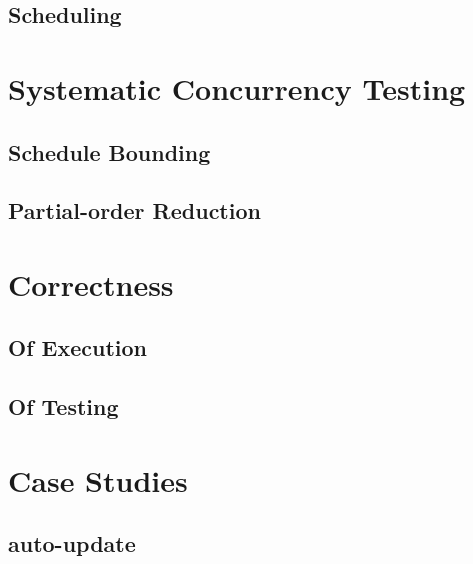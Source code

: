 \documentclass[openright, dottedtoc, headinclude, footinclude=true, a4paper, numbers=noenddot, fontsize=10pt]{scrreprt}
\begin{document}
  \section{Scheduling}
  \label{sec:execution-scheduling}
  

\null\clearpage
\chapter{Systematic Concurrency Testing}
\label{chap:sct}


  \section{Schedule Bounding}
  \label{sec:sct-bounding}
  

  \section{Partial-order Reduction}
  \label{sec:sct-por}
  

\null\clearpage
\chapter{Correctness}
\label{chap:correctness}


  \section{Of Execution}
  \label{sec:correctness-execution}
  

  \section{Of Testing}
  \label{sec:correctness-testing}
  

\null\clearpage
\chapter{Case Studies}
\label{chap:casestudies}


  \section{auto-update}
  \label{sec:casestudies-autoupdate}
  
\end{document}
